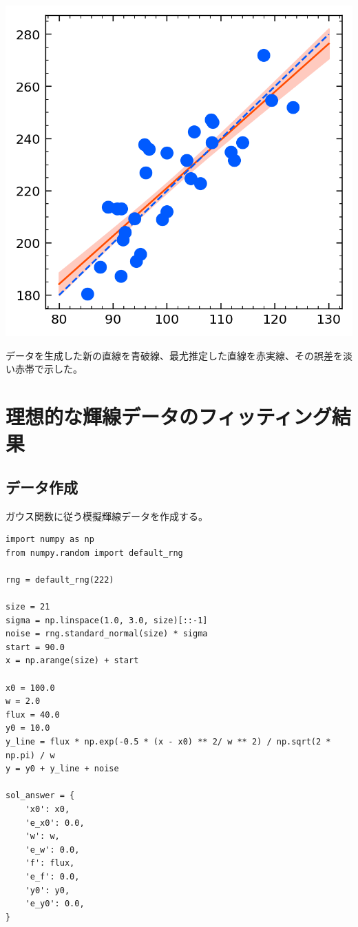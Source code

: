 \documentclass[a4paper, 8pt, notitlepage, uplatex, dvipdfmx]{jsarticle}
\begin{document}
\begin{center}
\includegraphics[width=1.0\linewidth]{./obipy-resources/fit_linear.png}
\end{center}

データを生成した新の直線を青破線、最尤推定した直線を赤実線、その誤差を淡い赤帯で示した。
\section{理想的な輝線データのフィッティング結果}
\label{sec:org948a8c6}
\subsection{データ作成}
\label{sec:org9c5e32c}
ガウス関数に従う模擬輝線データを作成する。
\begin{verbatim}
import numpy as np
from numpy.random import default_rng

rng = default_rng(222)

size = 21
sigma = np.linspace(1.0, 3.0, size)[::-1]
noise = rng.standard_normal(size) * sigma
start = 90.0
x = np.arange(size) + start

x0 = 100.0
w = 2.0
flux = 40.0
y0 = 10.0
y_line = flux * np.exp(-0.5 * (x - x0) ** 2/ w ** 2) / np.sqrt(2 * np.pi) / w
y = y0 + y_line + noise

sol_answer = {
    'x0': x0,
    'e_x0': 0.0,
    'w': w,
    'e_w': 0.0,
    'f': flux,
    'e_f': 0.0,
    'y0': y0,
    'e_y0': 0.0,
}
\end{verbatim}
\end{document}
